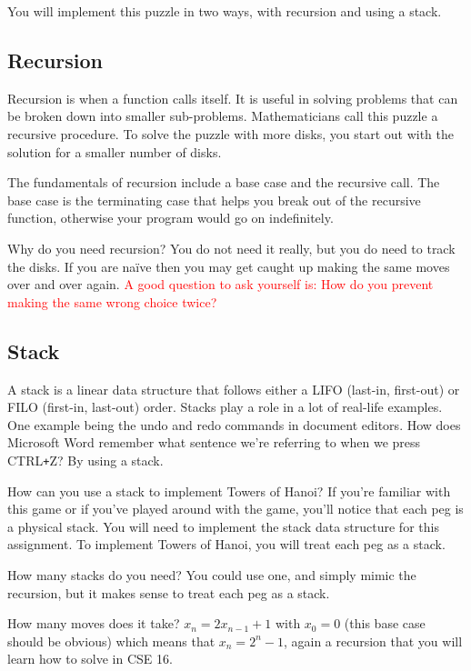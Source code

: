 \documentclass[11pt]{article}
\begin{document}
You will implement this puzzle in two ways, with recursion and using a stack.

\subsection{Recursion}
Recursion is when a function calls itself. It is useful in solving
problems that can be broken down into smaller sub-problems.
Mathematicians call this puzzle a recursive procedure. To solve the
puzzle with more disks, you start out with the solution for a smaller
number of disks.

The fundamentals of recursion include a base case and the recursive
call. The base case is the terminating case that helps you break
out of the recursive function, otherwise your program would go on
indefinitely.

Why do you need recursion? You do not need it really, but you do
need to track the disks. If you are na\"ive then you may get caught
up making the same moves over and over again. \textcolor{red}{A
good question to ask yourself is: How do you prevent making the
same wrong choice twice?}


\subsection{Stack}
A stack is a linear data structure that follows either a LIFO
(last-in, first-out) or FILO (first-in, last-out) order.  Stacks
play a role in a lot of real-life examples. One example being the
undo and redo commands in document editors. How does Microsoft Word
remember what sentence we're referring to when we press CTRL\texttt{+}Z?
By using a stack.

How can you use a stack to implement Towers of Hanoi? If you're familiar with this game or if you've played around with the game, you'll notice that each peg is a physical stack. You will need to implement the stack data structure for this assignment. To implement Towers of Hanoi, you will treat each peg as a stack.

How many stacks do you need? You could use one, and simply mimic the recursion,
but it makes sense to treat each peg as a stack.

How many moves does it take?
$x_n = 2 x_{n-1} + 1$ with $x_0 = 0$ (this base case should be obvious)
which means that $x_n = 2^n - 1$, again a recursion
that you will learn how to solve in CSE 16.
\end{document}
